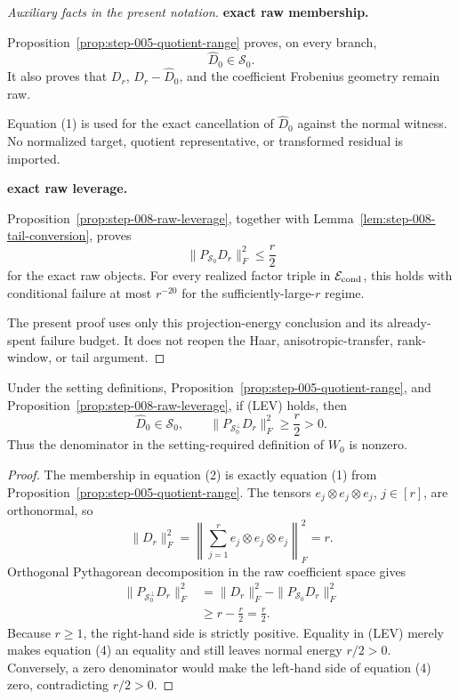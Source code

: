 \begin{proof}[Auxiliary facts in the present notation]


\medskip\noindent\textbf{exact raw membership.}\par

Proposition~\ref{prop:step-005-quotient-range} proves, on every branch,
\[
  \widehat D_0\in\mathscr S_0.
  \tag{1}
\]
It also proves that \(D_r\), \(D_r-\widehat D_0\), and the coefficient
Frobenius geometry remain raw.

Equation (1) is used for the exact
cancellation of \(\widehat D_0\) against the normal witness. No normalized
target, quotient representative, or transformed residual is imported.


\medskip\noindent\textbf{exact raw leverage.}\par

Proposition~\ref{prop:step-008-raw-leverage}, together with Lemma~\ref{lem:step-008-tail-conversion}, proves
\[
  \|P_{\mathscr S_0}D_r\|_F^2\le \frac r2
\]
for the exact raw objects. For every realized factor triple in
\(\mathcal E_{\rm cond}\), this holds with conditional failure at most
\(r^{-20}\) for the sufficiently-large-\(r\) regime.

The present proof uses only this
projection-energy conclusion and its already-spent failure budget. It does not
reopen the Haar, anisotropic-transfer, rank-window, or tail argument.

\end{proof}



\begin{lemma}
\label{lem:step-009-normal-energy}
Under the setting definitions, Proposition~\ref{prop:step-005-quotient-range}, and Proposition~\ref{prop:step-008-raw-leverage}, if (LEV) holds, then
\[
  \widehat D_0\in\mathscr S_0,
  \qquad
  \|P_{\mathscr S_0^\perp}D_r\|_F^2\ge\frac r2>0.
  \tag{2}
\]
Thus the denominator in the setting-required definition of \(W_0\) is
nonzero.

\end{lemma}

\begin{proof}
The membership in equation (2) is exactly equation (1) from
Proposition~\ref{prop:step-005-quotient-range}. The tensors
\(e_j\otimes e_j\otimes e_j\), \(j\in[r]\), are orthonormal, so
\[
  \|D_r\|_F^2
  =\left\|\sum_{j=1}^r e_j\otimes e_j\otimes e_j\right\|_F^2
  =r.
  \tag{3}
\]
Orthogonal Pythagorean decomposition in the raw coefficient space gives
\[
\begin{aligned}
  \|P_{\mathscr S_0^\perp}D_r\|_F^2
  &=\|D_r\|_F^2-\|P_{\mathscr S_0}D_r\|_F^2\\
  &\ge r-\frac r2
   =\frac r2.
\end{aligned}\tag{4}
\]
Because \(r\ge1\), the right-hand side is strictly positive. Equality in
(LEV) merely makes equation (4) an equality and still leaves normal energy
\(r/2>0\). Conversely, a zero denominator would make the left-hand side of
equation (4) zero, contradicting \(r/2>0\). 

\end{proof}


